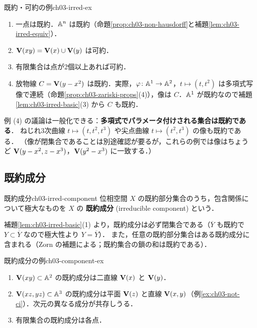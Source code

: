 \begin{myex}{既約・可約の例}{ch03-irred-ex}
\begin{enumerate}
  \item 一点は既約．$\mathbb{A}^n$ は既約（命題\ref{prop:ch03-non-hausdorff}と補題\ref{lem:ch03-irred-equiv}）．
  \item $\mathbf{V}(xy)=\mathbf{V}(x)\cup\mathbf{V}(y)$ は可約．
  \item 有限集合は点が2個以上あれば可約．
  \item 放物線 $C=\mathbf{V}(y-x^2)$ は既約．実際，$\varphi\colon\mathbb{A}^1\to\mathbb{A}^2$，$t\mapsto(t,t^2)$ は多項式写像で連続（命題\ref{prop:ch03-zariski-props}(4)），像は $C$．$\mathbb{A}^1$ が既約なので補題\ref{lem:ch03-irred-basic}(3) から $C$ も既約．
\end{enumerate}
\end{myex}

例 (4) の議論は一般化できる：\textbf{多項式でパラメータ付けされる集合は既約である}．
ねじれ3次曲線 $t\mapsto(t,t^2,t^3)$ や尖点曲線 $t\mapsto(t^2,t^3)$ の像も既約である．
（像が閉集合であることは別途確認が要るが，これらの例では像はちょうど $\mathbf{V}(y-x^2,z-x^3)$，$\mathbf{V}(y^2-x^3)$ に一致する．）

\subsection{既約成分}

\begin{mydef}{既約成分}{ch03-irred-component}
位相空間 $X$ の既約部分集合のうち，包含関係について極大なものを $X$ の \textbf{既約成分} (irreducible component) という．
\end{mydef}

補題\ref{lem:ch03-irred-basic}(1) より，既約成分は必ず閉集合である（$\overline Y$ も既約で $Y\subset\overline Y$ なので極大性より $Y=\overline Y$）．
また，任意の既約部分集合はある既約成分に含まれる（Zorn の補題による；既約集合の鎖の和は既約である）．

\begin{myex}{既約成分の例}{ch03-component-ex}
\begin{enumerate}
  \item $\mathbf{V}(xy)\subset\mathbb{A}^2$ の既約成分は二直線 $\mathbf{V}(x)$ と $\mathbf{V}(y)$．
  \item $\mathbf{V}(xz,yz)\subset\mathbb{A}^3$ の既約成分は平面 $\mathbf{V}(z)$ と直線 $\mathbf{V}(x,y)$（例\ref{ex:ch03-not-ci}）．次元の異なる成分が共存しうる．
  \item 有限集合の既約成分は各点．
\end{enumerate}
\end{myex}

